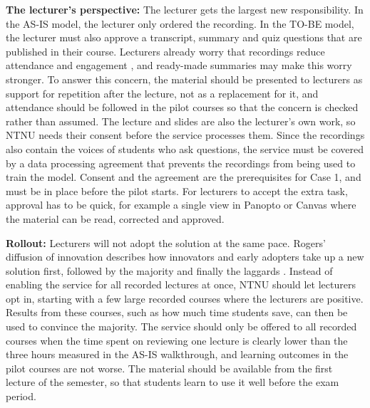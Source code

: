 \textbf{The lecturer's perspective:}
The lecturer gets the largest new responsibility. In the AS-IS model, the lecturer only ordered the recording. In the TO-BE model, the lecturer must also approve a transcript, summary and quiz questions that are published in their course. Lecturers already worry that recordings reduce attendance and engagement \parencite{ocallaghan2017}, and ready-made summaries may make this worry stronger. To answer this concern, the material should be presented to lecturers as support for repetition after the lecture, not as a replacement for it, and attendance should be followed in the pilot courses so that the concern is checked rather than assumed. The lecture and slides are also the lecturer's own work, so NTNU needs their consent before the service processes them. Since the recordings also contain the voices of students who ask questions, the service must be covered by a data processing agreement that prevents the recordings from being used to train the model. Consent and the agreement are the prerequisites for Case 1, and must be in place before the pilot starts. For lecturers to accept the extra task, approval has to be quick, for example a single view in Panopto or Canvas where the material can be read, corrected and approved.

\textbf{Rollout:}
Lecturers will not adopt the solution at the same pace. Rogers' diffusion of innovation describes how innovators and early adopters take up a new solution first, followed by the majority and finally the laggards \parencite{stair}. Instead of enabling the service for all recorded lectures at once, NTNU should let lecturers opt in, starting with a few large recorded courses where the lecturers are positive. Results from these courses, such as how much time students save, can then be used to convince the majority. The service should only be offered to all recorded courses when the time spent on reviewing one lecture is clearly lower than the three hours measured in the AS-IS walkthrough, and learning outcomes in the pilot courses are not worse. The material should be available from the first lecture of the semester, so that students learn to use it well before the exam period.


